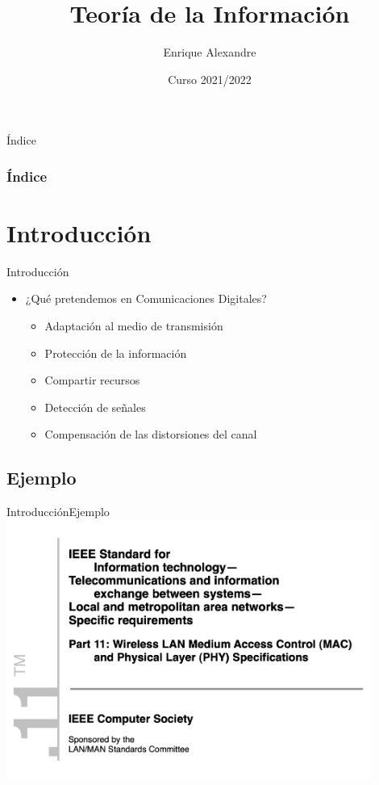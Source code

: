 \documentclass[10pt,compress]{beamer} %
\title[Teoría de la Información]{Teoría de la Información}
\author{Enrique Alexandre}
\institute{Dpto. de Teoría de la Señal y Comunicaciones}
\date{Curso 2021/2022}
\begin{document}
{\titlepageBlue
    \begin{frame}
        \titlepage
    \end{frame}
}

{
\begin{frame}[shrink]{Índice}
 \frametitle{Índice}
 \tableofcontents
\end{frame}
}

\section{Introducción}

\begin{frame}{Introducción}
  \begin{itemize}
    \item ¿Qué pretendemos en Comunicaciones Digitales?
    \begin{itemize}
      \item Adaptación al medio de transmisión
      \item Protección de la información
      \item Compartir recursos
      \item Detección de señales
      \item Compensación de las distorsiones del canal
    \end{itemize}
\end{itemize}
\end{frame}

\subsection{Ejemplo}
\begin{frame}{Introducción}{Ejemplo}
  \centering \includegraphics[width=0.9\textwidth]{./Figuras/Wifi1.pdf}
\end{frame}
\end{document}
